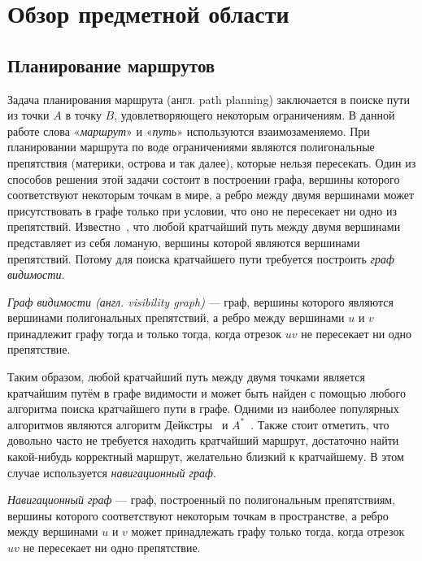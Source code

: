 \chapter{Обзор предметной области}

\section{Планирование маршрутов}

Задача планирования маршрута (англ. path planning) заключается в
поиске пути из точки $A$ в точку $B$, удовлетворяющего некоторым
ограничениям. В данной работе слова «\emph{маршрут}» и «\emph{путь}»
используются взаимозаменяемо. При планировании маршрута по воде
ограничениями являются полигональные препятствия (материки, острова и
так далее), которые нельзя пересекать. Один из способов решения этой
задачи состоит в построении графа, вершины которого соответствуют
некоторым точкам в мире, а ребро между двумя вершинами может
присутствовать в графе только при условии, что оно не пересекает ни
одно из препятствий. Известно~\cite{visibility-proof}, что любой кратчайший путь
между двумя вершинами представляет из себя ломаную, вершины которой
являются вершинами препятствий. Потому для поиска кратчайшего пути
требуется построить \emph{граф видимости}.

\emph{Граф видимости (англ. visibility graph)} --- граф, вершины
которого являются вершинами полигональных препятствий, а ребро между
вершинами $u$ и $v$ принадлежит графу тогда и только тогда, когда
отрезок $uv$ не пересекает ни одно препятствие.

Таким образом, любой кратчайший путь между двумя точками является
кратчайшим путём в графе видимости и может быть найден с помощью
любого алгоритма поиска кратчайшего пути в графе. Одними из наиболее
популярных алгоритмов являются алгоритм
Дейкстры~\cite{dijkstra1959note} и $A^*$~\cite{hart1968formal}. Также
стоит отметить, что довольно часто не требуется находить кратчайший
маршрут, достаточно найти какой-нибудь корректный маршрут, желательно
близкий к кратчайшему. В этом случае используется \emph{навигационный
  граф}.

\emph{Навигационный граф} --- граф, построенный по полигональным
препятствиям, вершины которого соответствуют некоторым точкам в
пространстве, а ребро между вершинами $u$ и $v$ может принадлежать
графу только тогда, когда отрезок $uv$ не пересекает ни одно
препятствие.

